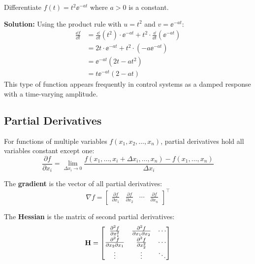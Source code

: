 \begin{examplebox}[title=Product Rule Application]
Differentiate $f(t) = t^2 \ee^{-at}$ where $a > 0$ is a constant.

\textbf{Solution:} Using the product rule with $u = t^2$ and $v = \ee^{-at}$:
\begin{align}
\frac{\dd f}{\dd t} &= \frac{\dd}{\dd t}(t^2) \cdot \ee^{-at} + t^2 \cdot \frac{\dd}{\dd t}(\ee^{-at}) \\
&= 2t \cdot \ee^{-at} + t^2 \cdot (-a\ee^{-at}) \\
&= \ee^{-at}(2t - at^2) \\
&= t\ee^{-at}(2 - at)
\end{align}
This type of function appears frequently in control systems as a damped response with a time-varying amplitude.
\end{examplebox}

\subsection{Partial Derivatives}

For functions of multiple variables $f(x_1, x_2, \ldots, x_n)$, partial derivatives hold all variables constant except one:
\begin{equation}
\frac{\partial f}{\partial x_i} = \lim_{\Delta x_i \to 0} \frac{f(x_1, \ldots, x_i + \Delta x_i, \ldots, x_n) - f(x_1, \ldots, x_n)}{\Delta x_i}
\end{equation}

The \textbf{gradient} is the vector of all partial derivatives:
\begin{equation}
\nabla f = \begin{bmatrix} \frac{\partial f}{\partial x_1} & \frac{\partial f}{\partial x_2} & \cdots & \frac{\partial f}{\partial x_n} \end{bmatrix}^\top
\end{equation}

The \textbf{Hessian} is the matrix of second partial derivatives:
\begin{equation}
\mathbf{H} = \begin{bmatrix}
\frac{\partial^2 f}{\partial x_1^2} & \frac{\partial^2 f}{\partial x_1 \partial x_2} & \cdots \\
\frac{\partial^2 f}{\partial x_2 \partial x_1} & \frac{\partial^2 f}{\partial x_2^2} & \cdots \\
\vdots & \vdots & \ddots
\end{bmatrix}
\end{equation}

